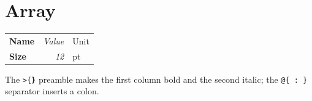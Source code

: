 \documentclass{article}
\begin{document}
\section{Array}
\begin{tabular}{>{\bfseries}l >{\itshape}r @{ : }l}
\hline
Name & Value & Unit \\
Size & 12    & pt   \\
\hline
\end{tabular}

The \texttt{>\{\bfseries\}} preamble makes the first column bold and
the second italic; the \texttt{@\{ : \}} separator inserts a colon.
\end{document}
